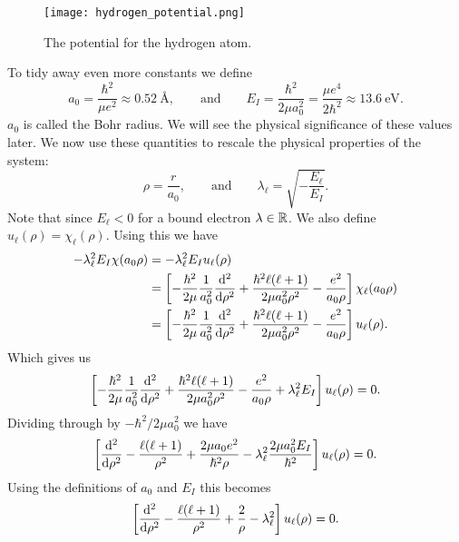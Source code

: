 \begin{figure}[ht]
    \centering
    \texttt{[image: hydrogen\_potential.png]}
    \caption{The potential for the hydrogen atom.}
    \label{fig:hydrogen atom potential}
\end{figure}

To tidy away even more constants we define
\[a_0 = \frac{\hbar^2}{\mu e^2} \approx \SI{0.52}{\angstrom}, \qquad \text{and} \qquad E_I = \frac{\hbar^2}{2\mu a_0^2} = \frac{\mu e^4}{2\hbar^2} \approx \SI{13.6}{\electronvolt}.\]
\(a_0\) is called the Bohr radius.
We will see the physical significance of these values later.
We now use these quantities to rescale the physical properties of the system:
\[\rho = \frac{r}{a_0}, \qquad\text{and}\qquad \lambda_\ell = \sqrt{-\frac{E_\ell}{E_I}}.\]
Note that since \(E_\ell < 0\) for a bound electron \(\lambda\in\mathbb{R}\).
We also define \(u_\ell(\rho) = \chi_\ell(\rho)\).
Using this we have
\begin{align*}
    -\lambda_\ell^2E_I\chi(a_0\rho) &= -\lambda_\ell^2E_I u_\ell(\rho)\\
    &= \left[-\frac{\hbar^2}{2\mu}\frac{1}{a_0^2}\dv[2]{\rho} + \frac{\hbar^2\ell(\ell + 1)}{2\mu a_0^2\rho^2} - \frac{e^2}{a_0\rho}\right]\chi_\ell(a_0\rho)\\
    &= \left[-\frac{\hbar^2}{2\mu}\frac{1}{a_0^2}\dv[2]{\rho} + \frac{\hbar^2\ell(\ell + 1)}{2\mu a_0^2\rho^2} - \frac{e^2}{a_0\rho}\right]u_\ell(\rho).
\end{align*}
Which gives us
\[\left[-\frac{\hbar^2}{2\mu}\frac{1}{a_0^2}\dv[2]{\rho} + \frac{\hbar^2\ell(\ell + 1)}{2\mu a_0^2\rho^2} - \frac{e^2}{a_0\rho} + \lambda_\ell^2E_I\right]u_\ell(\rho) = 0.\]
Dividing through by \(-\hbar^2/2\mu a_0^2\) we have
\[\left[\dv[2]{\rho} - \frac{\ell(\ell + 1)}{\rho^2} + \frac{2\mu a_0e^2}{\hbar^2\rho} - \lambda_\ell^2\frac{2\mu a_0^2E_I}{\hbar^2}\right]u_\ell(\rho) = 0.\]
Using the definitions of \(a_0\) and \(E_I\) this becomes
\[\left[\dv[2]{\rho} - \frac{\ell(\ell + 1)}{\rho^2} + \frac{2}{\rho} - \lambda_\ell^2\right]u_\ell(\rho) = 0.\]

